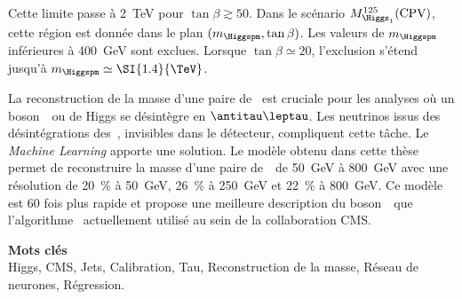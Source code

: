 Cette limite passe à
\SI{2}{\TeV} pour $\tan\beta\gtrsim\num{50}$.
Dans le scénario $M_{\Higgs_1}^{125}(\text{CPV})$,
cette région est donnée dans le plan $(m_{\Higgspm},\tan\beta)$.
Les valeurs de $m_{\Higgspm}$ inférieures à \SI{400}{\GeV} sont exclues.
Lorsque
$\tan\beta\simeq\num{20}$,
l'exclusion s'étend jusqu'à
$m_{\Higgspm} \simeq \SI{1.4}{\TeV}$.
\par
La reconstruction de la masse d'une paire de \tau\
est cruciale pour les analyses
où un boson~\Zboson\ ou de Higgs se désintègre en $\antitau\leptau$.
Les neutrinos issus des désintégrations des~\tau, invisibles dans le détecteur, compliquent cette tâche.
Le \emph{Machine Learning} apporte une solution.
Le modèle obtenu dans cette thèse permet
de reconstruire la masse d'une paire de~\tau\
de \SI{50}{\GeV} à \SI{800}{\GeV}
avec une résolution de
\SI{20}{\%} à \SI{50}{\GeV},
\SI{26}{\%} à \SI{250}{\GeV} et
\SI{22}{\%} à \SI{800}{\GeV}.
Ce modèle est
60 fois plus rapide
et propose une meilleure description du boson~\Zboson\
que l'algorithme \SVFIT\ actuellement utilisé au sein de la collaboration CMS.

\vfill

\textbf{\Large Mots clés}\\
Higgs,
CMS,
Jets,
Calibration,
Tau,
Reconstruction de la masse,
Réseau de neurones,
Régression.

\vfill